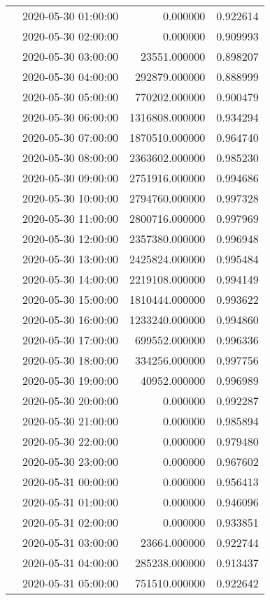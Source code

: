 \begin{tabular}{llrr}
 & 2020-05-30 01:00:00 & 0.000000 & 0.922614 \\
 & 2020-05-30 02:00:00 & 0.000000 & 0.909993 \\
 & 2020-05-30 03:00:00 & 23551.000000 & 0.898207 \\
 & 2020-05-30 04:00:00 & 292879.000000 & 0.888999 \\
 & 2020-05-30 05:00:00 & 770202.000000 & 0.900479 \\
 & 2020-05-30 06:00:00 & 1316808.000000 & 0.934294 \\
 & 2020-05-30 07:00:00 & 1870510.000000 & 0.964740 \\
 & 2020-05-30 08:00:00 & 2363602.000000 & 0.985230 \\
 & 2020-05-30 09:00:00 & 2751916.000000 & 0.994686 \\
 & 2020-05-30 10:00:00 & 2794760.000000 & 0.997328 \\
 & 2020-05-30 11:00:00 & 2800716.000000 & 0.997969 \\
 & 2020-05-30 12:00:00 & 2357380.000000 & 0.996948 \\
 & 2020-05-30 13:00:00 & 2425824.000000 & 0.995484 \\
 & 2020-05-30 14:00:00 & 2219108.000000 & 0.994149 \\
 & 2020-05-30 15:00:00 & 1810444.000000 & 0.993622 \\
 & 2020-05-30 16:00:00 & 1233240.000000 & 0.994860 \\
 & 2020-05-30 17:00:00 & 699552.000000 & 0.996336 \\
 & 2020-05-30 18:00:00 & 334256.000000 & 0.997756 \\
 & 2020-05-30 19:00:00 & 40952.000000 & 0.996989 \\
 & 2020-05-30 20:00:00 & 0.000000 & 0.992287 \\
 & 2020-05-30 21:00:00 & 0.000000 & 0.985894 \\
 & 2020-05-30 22:00:00 & 0.000000 & 0.979480 \\
 & 2020-05-30 23:00:00 & 0.000000 & 0.967602 \\
 & 2020-05-31 00:00:00 & 0.000000 & 0.956413 \\
 & 2020-05-31 01:00:00 & 0.000000 & 0.946096 \\
 & 2020-05-31 02:00:00 & 0.000000 & 0.933851 \\
 & 2020-05-31 03:00:00 & 23664.000000 & 0.922744 \\
 & 2020-05-31 04:00:00 & 285238.000000 & 0.913437 \\
 & 2020-05-31 05:00:00 & 751510.000000 & 0.922642 \\

\end{tabular}
